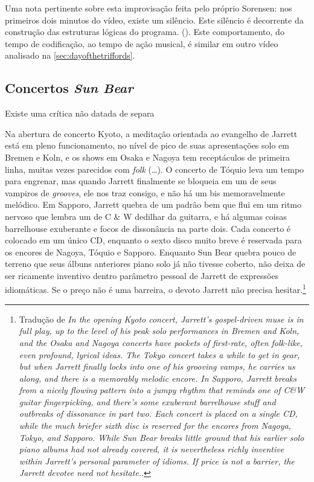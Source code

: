 \documentclass[
	12pt,				%
	openright,			%
	twoside,			%
	a4paper,			%
	english,			%
	french,				%
	spanish,			%
        italian,                        %
	brazil				%
	]{abntex2}
\begin{document}
Uma nota pertinente sobre esta improvisação feita pelo próprio Sorensen: nos primeiros dois minutos do vídeo, existe um silêncio. Este silêncio é decorrente da construção das estruturas lógicas do programa. (). Este comportamento, do tempo de codificação, ao tempo de ação musical, é similar em outro vídeo analisado na  \autoref{sec:dayofthetriffords}. 

\subsection{Concertos \emph{Sun Bear}}

Existe uma crítica não datada de  separa

\begin{citacao}
Na abertura de concerto Kyoto, a meditação orientada ao evangelho de Jarrett está em pleno funcionamento, no nível de pico de suas apresentações solo em Bremen e Koln, e os shows em Osaka e Nagoya tem receptáculos de primeira linha, muitas vezes parecidos com \emph{folk} (\ldots). O concerto de Tóquio leva um tempo para engrenar, mas quando Jarrett finalmente se bloqueia em um de seus vampiros de \emph{grooves}, ele nos traz consigo, e não há um bis memoravelmente melódico. Em Sapporo, Jarrett quebra de um padrão bem que flui em um ritmo nervoso que lembra um de C & W dedilhar da guitarra, e há algumas coisas barrelhouse exuberante e focos de dissonância na parte dois. Cada concerto é colocado em um único CD, enquanto o sexto disco muito breve é ​​reservada para os encores de Nagoya, Tóquio e Sapporo. Enquanto Sun Bear quebra pouco de terreno que seus álbuns anteriores piano solo já não tivesse coberto, não deixa de ser ricamente inventivo dentro parâmetro pessoal de Jarrett de expressões idiomáticas. Se o preço não é uma barreira, o devoto Jarrett não precisa hesitar.\footnote{Tradução de \emph{In the opening Kyoto concert, Jarrett's gospel-driven muse is in full play, up to the level of his peak solo performances in Bremen and Koln, and the Osaka and Nagoya concerts have pockets of first-rate, often folk-like, even profound, lyrical ideas. The Tokyo concert takes a while to get in gear, but when Jarrett finally locks into one of his grooving vamps, he carries us along, and there is a memorably melodic encore. In Sapporo, Jarrett breaks from a nicely flowing pattern into a jumpy rhythm that reminds one of C&W guitar fingerpicking, and there's some exuberant barrelhouse stuff and outbreaks of dissonance in part two. Each concert is placed on a single CD, while the much briefer sixth disc is reserved for the encores from Nagoya, Tokyo, and Sapporo. While Sun Bear breaks little ground that his earlier solo piano albums had not already covered, it is nevertheless richly inventive within Jarrett's personal parameter of idioms. If price is not a barrier, the Jarrett devotee need not hesitate.}.}
\end{citacao}
\end{document}
